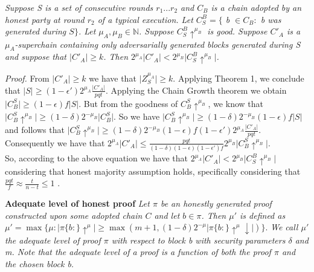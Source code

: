 \begin{lemma}
	\textit{Suppose S is a set of consecutive rounds $r_1 ... r_2$
	and $C_B$ is a chain adopted by an honest party at round $r_2$ of a typical
	execution. Let $C^{B}_{S} = \{$ b $\in C_B:$ b was generated during $S\}$. Let
	$\mu_A, \mu_B \in \mathbb{N}$. Suppose $C^{B}_{S}\uparrow^{\mu_B}$ is good.
	Suppose $C'_A$ is a $\mu_A$-superchain containing only adversarially generated
	blocks generated during S and suppose that $\vert C'_A \vert \geq k$. Then
	$2^{\mu_A} \vert C'_A \vert <  2^{\mu_B} \vert    C^{B}_{S}\uparrow^{\mu_B}\vert $. }\\
	\label{lemma:honest_vs_pure_adversarial_subchain}
\end{lemma}
\textit{Proof.} From $\vert C'_A \vert \geq k$ we have that $\vert Z^{\mu_A}_S
\vert \geq k$. Applying Theorem 1, we conclude that $\vert S \vert \geq
(1-\epsilon')2^{\mu_A} \frac{\vert C'_A \vert}{pqt}$. Applying the Chain Growth
theorem \cite{Backbone} we obtain $\vert C_{B}^S \vert \geq (1 - \epsilon)f
\vert S \vert$. But from the goodness of $C_{B}^S \uparrow^{\mu_B}$, we know
that $\vert C_{B}^S\uparrow^{\mu_B} \vert \geq (1 - \delta)2^{-\mu_B} \vert
C_{B}^S \vert $. So we have $\vert C_{B}^S\uparrow^{\mu_B} \vert \geq
(1 - \delta)2^{-\mu_B} (1 - \epsilon)f \vert S \vert $ and follows that
$\vert C_{B}^S\uparrow^{\mu_B} \vert \geq (1 - \delta)2^{-\mu_B} (1 - \epsilon)f
(1-\epsilon')2^{\mu_A} \frac{\vert C'_A \vert}{pqt} $. Consequently we have that
$2^{\mu_A} \vert C'_A \vert \leq \frac{pqt}{(1- \delta)(1-\epsilon)(1-\epsilon')f}
2^{\mu_B} \vert C_{B}^S\uparrow^{\mu_B} \vert $.   \\

So, according to the above equation we have that $2^{\mu_A} \vert C'_A \vert
<  2^{\mu_B} \vert    C^{B}_{S}\uparrow^{\mu_B}\vert $ considering that honest
majority assumption holds, specifically considering that $ \frac{pqt}{f} \approx
\frac{t}{n-t} \leq 1 $ .\\

\begin{defn}{\textbf{Adequate level of honest proof}}
	\textit{Let $\pi$ be an
	honestly generated proof constructed upon some adopted chain $C$ and let $b \in 
	\pi $. Then $\mu'$ is defined as $\mu' = \max \{ \mu: \vert \pi\{b:\}\uparrow^{\mu}
	\vert \geq \max( m+1, (1-\delta)2^{-\mu} \vert \pi\{b:\}\uparrow^{\mu}\downarrow \vert )\}$}.
	\textit{We call $\mu'$ the adequate level of proof $\pi$ with respect to block b with
	security parameters $\delta$ and m. Note that the adequate level of a proof is a
	function of both the proof $\pi$ and the chosen block b.}
\end{defn}

